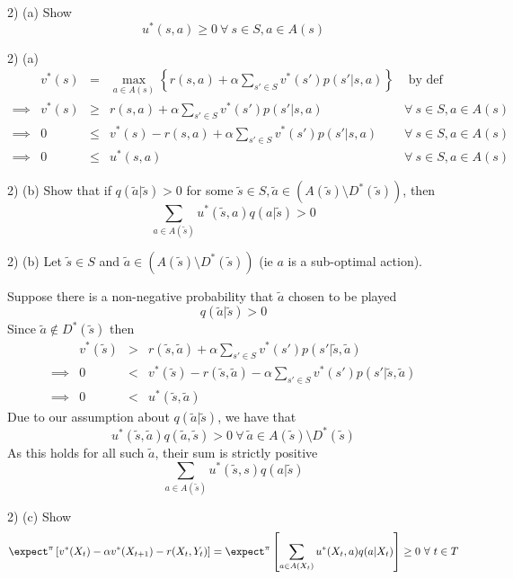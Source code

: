 \documentclass[11pt,a4paper]{article}
\begin{document}
\begin{question}{2) (a)}
  Show
  \[ u^*(s,a)\geq0\ \forall\ s\in S,a\in A(s) \]
\end{question}

\begin{answer}{2) (a)}
  \[\begin{array}{rrcll}
    &v^*(s)&=&\max_{a\in A(s)}\left\{r(s,a)+\alpha\sum_{s'\in S}v^*(s')p(s'|s,a)\right\}&\text{ by def}\\
    \implies&v^*(s)&\geq&r(s,a)+\alpha\sum_{s'\in S}v^*(s')p(s'|s,a)&\forall\ s\in S,a\in A(s)\\
    \implies&0&\leq&v^*(s)-r(s,a)+\alpha\sum_{s'\in S}v^*(s')p(s'|s,a)&\forall\ s\in S,a\in A(s)\\
    \implies&0&\leq&u^*(s,a)&\forall\ s\in S,a\in A(s)
  \end{array}\]
\end{answer}

\begin{question}{2) (b)}
  Show that if $q(\tilde{a}|\tilde{s})>0$ for some $\tilde{s}\in S,\tilde{a}\in(A(\tilde{s})\setminus D^*(\tilde{s}))$, then
  \[ \sum_{a\in A(\tilde{s})}u^*(\tilde{s},a)q(a|\tilde{s})>0 \]
\end{question}

\begin{answer}{2) (b)}
  Let $\tilde{s}\in S$ and $\tilde{a}\in (A(\tilde{s})\setminus D^*(\tilde{s}))$ (ie $a$ is a sub-optimal action).
  \par Suppose there is a non-negative probability that $\tilde{a}$ chosen to be played
  \[ q(\tilde{a}|\tilde{s})>0 \]
  Since $\tilde{a}\not\in D^*(\tilde{s})$ then
  \[\begin{array}{rrcl}
    &v^*(\tilde{s})&>&r(\tilde{s},\tilde{a})+\alpha\sum_{s'\in S}v^*(s')p(s'|\tilde{s},\tilde{a})\\
    \implies&0&<&v^*(\tilde{s})-r(\tilde{s},\tilde{a})-\alpha\sum_{s'\in S}v^*(s')p(s'|\tilde{s},\tilde{a})\\
    \implies&0&<&u^*(\tilde{s},\tilde{a})
  \end{array}\]
  Due to our assumption about $q(\tilde{a}|\tilde{s})$, we have that
  \[ u^*(\tilde{s},\tilde{a})q(\tilde{a},\tilde{s})>0\ \forall\ \tilde{a}\in A(\tilde{s})\setminus D^*(\tilde{s}) \]
  As this holds for all such $\tilde{a}$, their sum is strictly positive
  \[ \sum_{a\in A(\tilde{s})}u^*(\tilde{s},s)q(a|\tilde{s}) \]
\end{answer}

\begin{question}{2) (c)}
  Show
  \[ \expect^\pi\left[v^*(X_t)-\alpha v^*(X_{t+1})-r(X_t,Y_t)\right]=\expect^\pi\left[\sum_{a\in A(X_t)}u^*(X_t,a)q(a|X_t)\right]\geq0\ \forall\ t\in T \]
\end{question}
\end{document}
